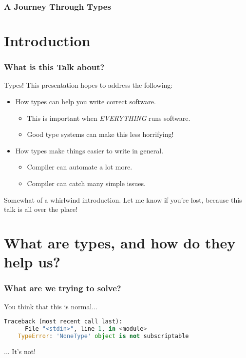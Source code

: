 \documentclass{beamer}
\author{
  Beck, Calvin\\
  \href{mailto:hobbes@ualberta.ca}{hobbes@ualberta.ca}
}
\begin{document}
\begin{frame}
  \frametitle{A Journey Through Types}
  \maketitle
\end{frame}

\section{Introduction}

\begin{frame}
  \frametitle{What is this Talk about?}

  Types! This presentation hopes to address the following:

  \begin{itemize}
  \item How types can help you write correct software.
    \begin{itemize}
    \item This is important when \emph{EVERYTHING} runs software.
    \item Good type systems can make this less horrifying!
    \end{itemize}
  \item How types make things easier to write in general.
    \begin{itemize}
    \item Compiler can automate a lot more.
    \item Compiler can catch many simple issues.
    \end{itemize}
  \end{itemize}

  \pause

  Somewhat of a whirlwind introduction. Let me know if you're lost,
  because this talk is all over the place!
\end{frame}

\section{What are types, and how do they help us?}

\begin{frame}[fragile]
  \frametitle{What are we trying to solve?}

  You think that this is normal...

  \pause

  \begin{lstlisting}[frame=single, language=Python, breaklines=true]
    Traceback (most recent call last):
      File "<stdin>", line 1, in <module>
    TypeError: 'NoneType' object is not subscriptable
  \end{lstlisting}

  \pause

  \huge{... It's not!}
\end{frame}
\end{document}
